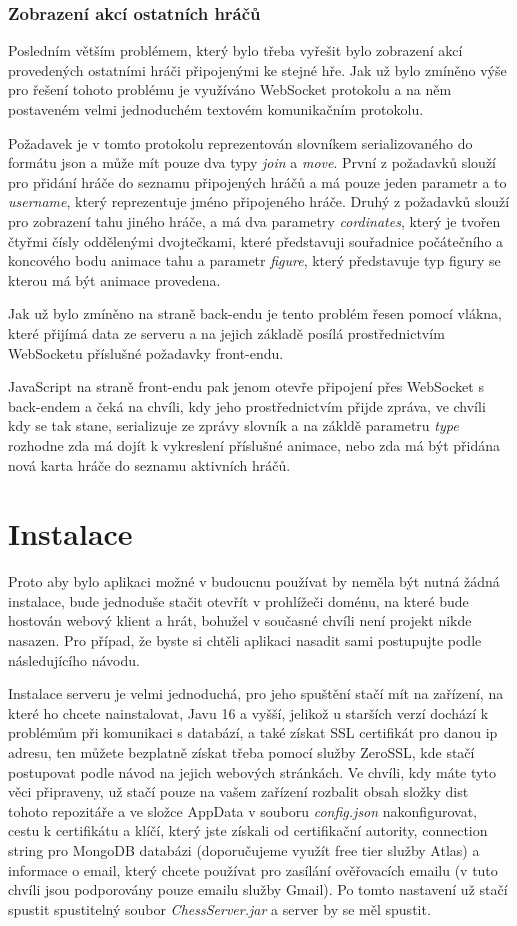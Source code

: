 \documentclass[12pt]{article}
\begin{document}
\subsubsection{Zobrazení akcí ostatních hráčů}
Posledním větším problémem, který bylo třeba vyřešit bylo zobrazení akcí provedených ostatními hráči připojenými ke stejné hře. Jak už bylo zmíněno výše pro řešení tohoto problému je využíváno WebSocket protokolu a na něm postaveném velmi jednoduchém textovém komunikačním protokolu.

Požadavek je v tomto protokolu reprezentován slovníkem serializovaného do formátu json a může mít pouze dva typy \textit{join} a \textit{move}. První z požadavků slouží pro přidání hráče do seznamu připojených hráčů a má pouze jeden parametr a to \textit{username}, který reprezentuje jméno připojeného hráče. Druhý z požadavků slouží pro zobrazení tahu jiného hráče, a má dva parametry \textit{cordinates}, který je tvořen čtyřmi čísly oddělenými dvojtečkami, které představuji souřadnice počátečního a koncového bodu animace tahu a parametr \textit{figure}, který představuje typ figury se kterou má být animace provedena.

Jak už bylo zmíněno na straně back-endu je tento problém řesen pomocí vlákna, které přijímá data ze serveru a na jejich základě posílá prostřednictvím WebSocketu příslušné požadavky front-endu.

JavaScript na straně front-endu pak jenom otevře připojení přes WebSocket s back-endem a čeká na chvíli, kdy jeho prostřednictvím přijde zpráva, ve chvíli kdy se tak stane, serializuje ze zprávy slovník a na zákldě parametru \textit{type} rozhodne zda má dojít k vykreslení příslušné animace, nebo zda má být přidána nová karta hráče do seznamu aktivních hráčů.
\newpage
\section{Instalace}
Proto aby bylo aplikaci možné v budoucnu používat by neměla být nutná žádná instalace, bude jednoduše stačit otevřít v prohlížeči doménu, na které bude hostován webový klient a hrát, bohužel v současné chvíli není projekt nikde nasazen. Pro případ, že byste si chtěli aplikaci nasadit sami postupujte podle následujícího návodu.

Instalace serveru je velmi jednoduchá, pro jeho spuštění stačí mít na zařízení, na které ho chcete nainstalovat, Javu 16 a vyšší, jelikož u starších verzí dochází k problémům při komunikaci s databází, a také získat SSL certifikát pro danou ip adresu, ten můžete bezplatně získat třeba pomocí služby ZeroSSL, kde stačí postupovat podle návod na jejich webových stránkách. Ve chvíli, kdy máte tyto věci připraveny, už stačí pouze na vašem zařízení rozbalit obsah složky dist tohoto repozitáře a ve složce AppData v souboru \textit{config.json} nakonfigurovat, cestu k certifikátu a klíčí, který jste získali od certifikační autority, connection string pro MongoDB databázi (doporučujeme využít free tier služby Atlas) a informace o email, který chcete používat pro zasílání ověřovacích emailu (v tuto chvíli jsou podporovány pouze emailu služby Gmail). Po tomto nastavení už stačí spustit spustitelný soubor \textit{ChessServer.jar} a server by se měl spustit.
\end{document}
